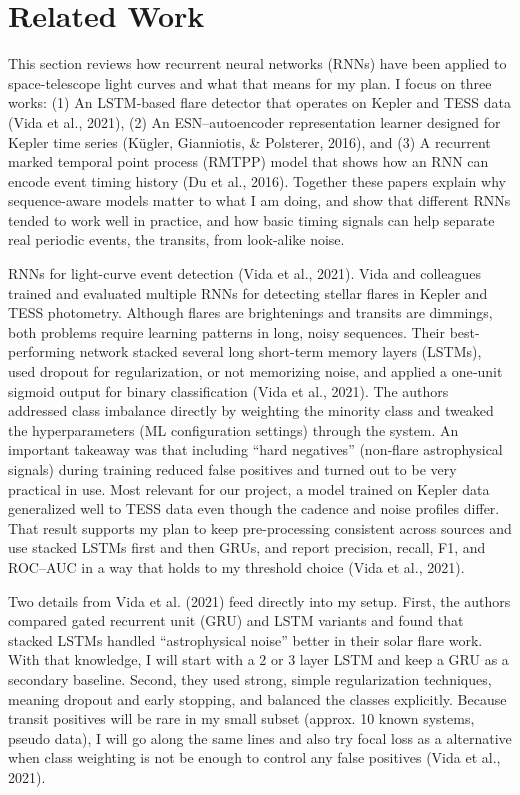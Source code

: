 \documentclass[letterpaper]{article}
\begin{document}
\section*{Related Work}
This section reviews how recurrent neural networks (RNNs) have been applied to space-telescope light curves and what that means for my plan. I focus on three works: (1) An LSTM-based flare detector that operates on Kepler and TESS data (Vida et al., 2021), (2) An ESN–autoencoder representation learner designed for Kepler time series (Kügler, Gianniotis, \& Polsterer, 2016), and (3) A recurrent marked temporal point process (RMTPP) model that shows how an RNN can encode event timing history (Du et al., 2016). Together these papers explain why sequence-aware models matter to what I am doing, and show that different RNNs tended to work well in practice, and how basic timing signals can help separate real periodic events, the transits, from look‑alike noise.

RNNs for light-curve event detection (Vida et al., 2021). Vida and colleagues trained and evaluated multiple RNNs for detecting stellar flares in Kepler and TESS photometry. Although flares are brightenings and transits are dimmings, both problems require learning patterns in long, noisy sequences. Their best-performing network stacked several long short-term memory layers (LSTMs), used dropout for regularization, or not memorizing noise, and applied a one‑unit sigmoid output for binary classification (Vida et al., 2021). The authors addressed class imbalance directly by weighting the minority class and tweaked the hyperparameters (ML configuration settings) through the system. An important takeaway was that including “hard negatives” (non‑flare astrophysical signals) during training reduced false positives and turned out to be very practical in use. Most relevant for our project, a model trained on Kepler data generalized well to TESS data even though the cadence and noise profiles differ. That result supports my plan to keep pre-processing consistent across sources and use stacked LSTMs first and then GRUs, and report precision, recall, F1, and ROC–AUC in a way that holds to my threshold choice (Vida et al., 2021).

Two details from Vida et al. (2021) feed directly into my setup. First, the authors compared gated recurrent unit (GRU) and LSTM variants and found that stacked LSTMs handled “astrophysical noise” better in their solar flare work. With that knowledge, I will start with a 2 or 3 layer LSTM and keep a GRU as a secondary baseline. Second, they used strong, simple regularization techniques, meaning dropout and early stopping, and balanced the classes explicitly. Because transit positives will be rare in my small subset (approx. 10 known systems, pseudo data), I will go along the same lines and also try focal loss as a alternative when class weighting is not be enough to control any false positives (Vida et al., 2021).
\end{document}
